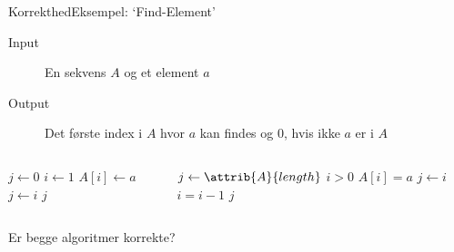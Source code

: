 \documentclass{beamer}
\begin{document}
\begin{frame}{Korrekthed}{Eksempel: `Find-Element'}
    \begin{description}
        \item[Input] En sekvens $A$ og et element $a$
        \item[Output] Det første index i $A$ hvor $a$ kan findes og 0, hvis ikke
            $a$ er i $A$
    \end{description}

    \pause
    \begin{columns}

        \begin{codebox}
            \li $j \gets 0$
            \li \For $i \gets 1$ \To {} \Do
                \li \If $A[i] \gets a$ \Then
                    \li $j \gets i$
                \End
            \End
            \li \Return $j$
        \end{codebox}



        \begin{codebox}
            \li $j \gets \attrib{A}{length}$
            \li \While $i > 0$ \Do
                \li \If $A[i] = a$ \Then
                    \li $j \gets i$
                \End
                \li $i = i - 1$
            \End
            \li \Return $j$
        \end{codebox}


    \end{columns}

    \medskip
    Er begge algoritmer korrekte? 
\end{frame}
\end{document}
